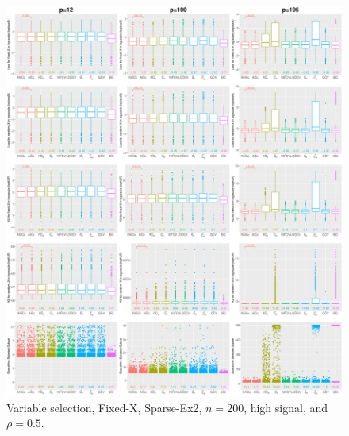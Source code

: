 \begin{figure}[!ht]
\centering
\includegraphics[width=\textwidth]{figures/supplement/fixedx/subset_selection/Sparse-Ex2_n200_hsnr_rho05.eps}
\caption{Variable selection, Fixed-X, Sparse-Ex2, $n=200$, high signal, and $\rho=0.5$.}
\end{figure}
\clearpage
